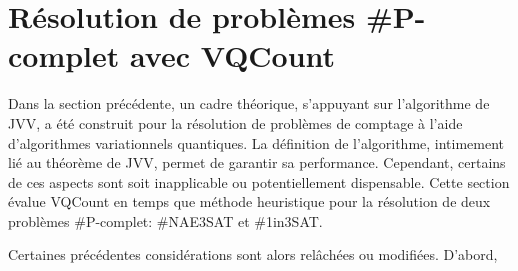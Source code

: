 \chapter{Résolution de problèmes \textsf{\#P}-complet avec VQCount}

Dans la section précédente, un cadre théorique, s'appuyant sur l'algorithme de JVV, a été construit pour la résolution de problèmes de comptage à l'aide d'algorithmes variationnels quantiques. La définition de l'algorithme, intimement lié au théorème de JVV, permet de garantir sa performance. Cependant, certains de ces aspects sont soit inapplicable ou potentiellement dispensable. Cette section évalue VQCount en temps que méthode heuristique pour la résolution de deux problèmes \textsf{\#P}-complet: \#NAE3SAT et \#1in3SAT.

Certaines précédentes considérations sont alors relâchées ou modifiées. D'abord, 

